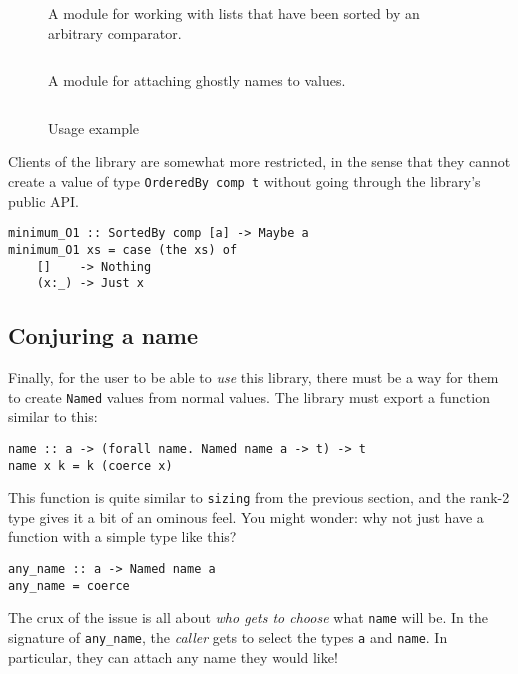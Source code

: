 \documentclass[format=sigplan, review=false, screen=true]{acmart}
\begin{document}
\begin{figure}
  \inputminted{haskell}{ordered.hs}
  \caption{A module for working with lists that have been sorted by an arbitrary
    comparator.}
\end{figure}


\begin{figure}
  \inputminted{haskell}{named.hs}
  \caption{A module for attaching ghostly names to values.}
\end{figure}

\begin{figure}
  \inputminted{haskell}{usageO.hs}
  \caption{Usage example}
  \end{figure}
Clients of the library are somewhat more restricted, in the sense that they cannot create a
value of type \texttt{OrderedBy comp t} without going through the library's public API.

\begin{verbatim}
minimum_O1 :: SortedBy comp [a] -> Maybe a
minimum_O1 xs = case (the xs) of
    []    -> Nothing
    (x:_) -> Just x
\end{verbatim}

\subsection{Conjuring a name}

Finally, for the user to be able to \emph{use} this library, there must be a way for
them to create \texttt{Named} values from normal values. The library must export a
function similar to this:

\begin{lstlisting}
name :: a -> (forall name. Named name a -> t) -> t
name x k = k (coerce x)
\end{lstlisting}

This function is quite similar to \texttt{sizing} from the previous section, and the rank-2
type gives it a bit of an ominous feel. You might wonder: why not just have a function
with a simple type like this?

\begin{lstlisting}
any_name :: a -> Named name a
any_name = coerce
\end{lstlisting}

The crux of the issue is all about \emph{who gets to choose} what \texttt{name} will be.
In the signature of \texttt{any\_name}, the \emph{caller} gets to select the types \texttt{a}
and \texttt{name}. In particular, they can attach any name they would like!
\end{document}

